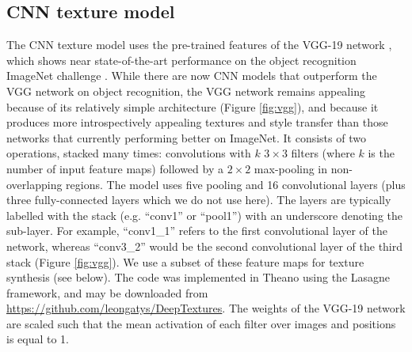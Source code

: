\documentclass[doc, 11pt,a4paper,natbib]{apa6}\usepackage[]{graphicx}\usepackage[]{color}
\begin{document}
\subsection{CNN texture model}

The CNN texture model \citep{gatys_texture_2015-1} uses the pre-trained features of the VGG-19 network \citep{simonyan_very_2015}, which shows near state-of-the-art performance on the object recognition ImageNet challenge \citep{imagenet_2015}.
While there are now CNN models that outperform the VGG network on object recognition, the VGG network remains appealing because of its relatively simple architecture (Figure \ref{fig:vgg}), and because it produces more introspectively appealing textures and style transfer than those networks that currently performing better on ImageNet. 
It consists of two operations, stacked many times: convolutions with $k$ $3 \times 3$ filters (where $k$ is the number of input feature maps) followed by a $2 \times 2$ max-pooling in non-overlapping regions.
The model uses five pooling and 16 convolutional layers (plus three fully-connected layers which we do not use here). 
The layers are typically labelled with the stack (e.g. ``conv1'' or ``pool1'') with an underscore denoting the sub-layer.
For example, ``conv1\_1'' refers to the first convolutional layer of the network, whereas ``conv3\_2'' would be the second convolutional layer of the third stack (Figure \ref{fig:vgg}).
We use a subset of these feature maps for texture synthesis (see below).
The code was implemented in Theano using the Lasagne framework, and may be downloaded from \url{https://github.com/leongatys/DeepTextures}.
The weights of the VGG-19 network are scaled such that the mean activation of each filter over images and positions is equal to 1.
\end{document}
